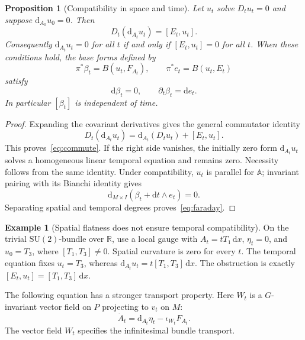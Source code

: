 \documentclass[11pt,a4paper]{article}
\numberwithin{equation}{section}
\newtheorem{proposition}[theorem]{Proposition}
\theoremstyle{definition}
\newtheorem{example}[theorem]{Example}
\theoremstyle{remark}
\newcommand{\R}{\mathbb R}
\newcommand{\SU}{\mathrm{SU}}
\newcommand{\dd}{\mathrm d}
\begin{document}
\begin{proposition}[Compatibility in space and time]\label{prop:mixed}
Let $u_t$ solve $D_tu_t=0$ and suppose $\dd_{A_0}u_0=0$. Then
\begin{equation}\label{eq:commute}
 D_t(\dd_{A_t}u_t)=[E_t,u_t].
\end{equation}
Consequently $\dd_{A_t}u_t=0$ for all $t$ if and only if
$[E_t,u_t]=0$ for all $t$. When these conditions hold, the base forms
defined by
\[
 \pi^*\beta_t=B(u_t,F_{A_t}),\qquad
 \pi^*e_t=B(u_t,E_t)
\]
satisfy
\begin{equation}\label{eq:faraday}
 \dd\beta_t=0,\qquad \partial_t\beta_t=\dd e_t.
\end{equation}
In particular $[\beta_t]$ is independent of time.
\end{proposition}

\begin{proof}
Expanding the covariant derivatives gives the general commutator identity
\[
 D_t(\dd_{A_t}u_t)=\dd_{A_t}(D_tu_t)+[E_t,u_t].
\]
This proves~\eqref{eq:commute}. If the right side vanishes, the
initially zero form $\dd_{A_t}u_t$ solves a homogeneous linear temporal
equation and remains zero. Necessity follows from the same identity.
Under compatibility, $u_t$ is parallel for $\mathbb A$; invariant pairing
with its Bianchi identity gives
\[
 \dd_{M\times I}(\beta_t+\dd t\wedge e_t)=0.
\]
Separating spatial and temporal degrees proves~\eqref{eq:faraday}.
\end{proof}

\begin{example}[Spatial flatness does not ensure temporal compatibility]
On the trivial $\SU(2)$-bundle over $\R$, use a local gauge with
$A_t=tT_1\,\dd x$, $\eta_t=0$, and $u_0=T_3$, where
$[T_1,T_3]\ne0$. Spatial curvature is zero for every $t$.
The temporal equation fixes $u_t=T_3$, whereas
$\dd_{A_t}u_t=t[T_1,T_3]\,\dd x$. The obstruction is exactly
$[E_t,u_t]=[T_1,T_3]\,\dd x$.
\end{example}

The following equation has a stronger transport property. Here $W_t$ is a
$G$-invariant vector field on $P$ projecting to $v_t$ on $M$:
\begin{equation}\label{eq:transport}
 \dot A_t=\dd_{A_t}\eta_t-\iota_{W_t}F_{A_t}.
\end{equation}
The vector field $W_t$ specifies the infinitesimal bundle transport.
\end{document}

